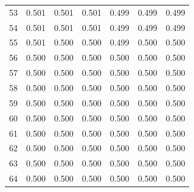 \documentclass[]{elsarticle}
\begin{document}
\begin{appendix}
\begin{table}[H]
\begin{tabular}[c]{lcccccc}
53&0.501&0.501&0.501&0.499&0.499&0.499\\
54&0.501&0.501&0.501&0.499&0.499&0.499\\
55&0.501&0.500&0.500&0.499&0.500&0.500\\
56&0.500&0.500&0.500&0.500&0.500&0.500\\
57&0.500&0.500&0.500&0.500&0.500&0.500\\
58&0.500&0.500&0.500&0.500&0.500&0.500\\
59&0.500&0.500&0.500&0.500&0.500&0.500\\
60&0.500&0.500&0.500&0.500&0.500&0.500\\
61&0.500&0.500&0.500&0.500&0.500&0.500\\
62&0.500&0.500&0.500&0.500&0.500&0.500\\
63&0.500&0.500&0.500&0.500&0.500&0.500\\
64&0.500&0.500&0.500&0.500&0.500&0.500\\
		\hline
	\end{tabular}
\end{table}



\end{appendix}
\end{document}
